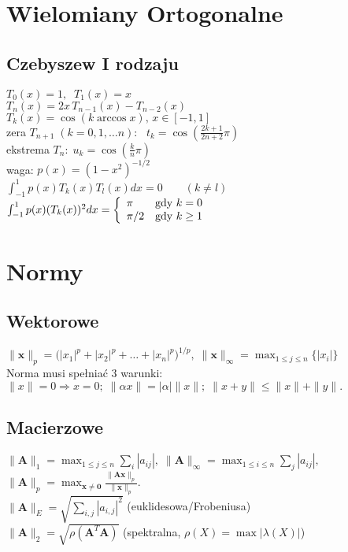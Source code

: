 \documentclass[a4paper,twocolumn]{article}
\begin{document}
\section{Wielomiany Ortogonalne}

\subsection{Czebyszew I rodzaju}
$T_0(x) = 1,\;\;T_1(x) = x$\\
$T_n(x) = 2x\,T_{n-1}(x) - T_{n-2}(x)$\\
$T_{k}(x) = \cos(k\arccos x),\,x\in [-1,1]$\\
zera $T_{n+1}\;(k=0,1,\ldots n)$: \, $t_k=\cos\left(\frac{2k+1}{2n+2}\pi\right)$\\
ekstrema $T_{n}:\; u_k = \cos\left(\frac{k}{n}\pi\right)$\\
waga: $p(x) = (1-x^2)^{-1/2}$\\
$ \int_{-1}^{1} p(x)T_k(x)T_l(x) dx = 0 \qquad (k \neq l) $\\
$  \int_{-1}^{1} p(x)(T_k(x))^2 dx = \left\{ \begin{array}{ll}
\pi & \textrm{gdy $k=0$}\\
\pi/2 & \textrm{gdy $ k \geq 1 $}
\end{array} \right.$

\section{Normy}
\subsection{Wektorowe}
${\displaystyle \|\mathbf {x} \|_{p}={\bigl (}|x_{1}|^{p}+|x_{2}|^{p}+\ldots +|x_{n}|^{p}{\bigr )}^{1/p},\;\|\mathbf {x} \|_{\infty }=\max_{1 \leq j \leq n} {\bigl \{}|x_{i}| {\bigr \}}}$ \\
Norma musi spełniać 3 warunki:\\
${\displaystyle \|x\|=0\Rightarrow x=0;\; \|\alpha x\|=|\alpha |\|x\|;\;  \|x+y\|\leqslant \|x\|+\|y\|.}$
\subsection{Macierzowe}
${\displaystyle \|\mathbf {A} \|_{1}=\max _{1 \leq j \leq n}\sum _{i}|a_{ij}|,\; \|\mathbf {A} \|_{\infty }=\max _{1\leq i\leq n}\sum _{j}|a_{ij}|,\;}$\\
${\displaystyle \|\mathbf {A} \|_{p}=\max _{\mathbf {x} \neq \mathbf {0} }{\tfrac {\|\mathbf {Ax} \|_{p}}{\|\mathbf {x} \|_{p}}}.}$\\
${\displaystyle \|\mathbf {A} \|_{E}=\sqrt{\sum_{i,j}|a_{i,j}|^2}}$ (euklidesowa/Frobeniusa)\\
${\displaystyle \|\mathbf {A} \|_{2}=\sqrt{\rho(\mathbf{A}^T\mathbf{A})}}$ (spektralna, $\rho(X) = \max |\lambda(X)|$)
\end{document}
